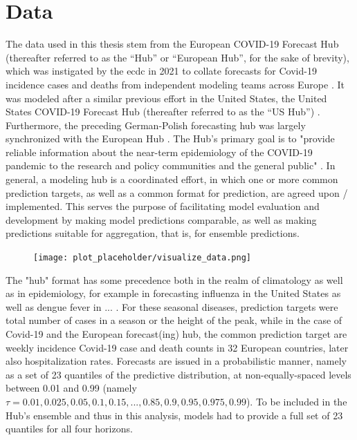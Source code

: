 \section{Data}
The data used in this thesis stem from the European COVID-19 Forecast Hub (thereafter referred to as the ``Hub'' or ``European Hub'', for the sake of brevity), which was instigated by the \ac{ecdc} in 2021 to collate forecasts for Covid-19 incidence cases and deaths from independent modeling teams across Europe \citep{european_covid-19_forecast_hub_european_2021}. It was modeled after a similar previous effort in the United States, the United States COVID-19 Forecast Hub (thereafter referred to as the ``US Hub'') \citep{cramer_united_2021}. Furthermore, the preceding German-Polish forecasting hub was largely synchronized with the European Hub \citep{bracher_german_2020}. The Hub's primary goal is to "provide reliable information about the near-term epidemiology of the COVID-19 pandemic to the research and policy communities and the general public" \citep{sherratt_predictive_2022}. In general, a modeling hub is a coordinated effort, in which one or more common prediction targets, as well as a common format for prediction, are agreed upon / implemented. This serves the purpose of facilitating model evaluation and development by making model predictions comparable, as well as making predictions suitable for aggregation, that is, for ensemble predictions. \\
\begin{figure}
\texttt{[image: plot\_placeholder/visualize\_data.png]}
\end{figure}
The "hub" format has some precedence both in the realm of climatology as well as in epidemiology, for example in forecasting influenza in the United States \cite{reich_collaborative_2019} as well as dengue fever in ... \cite{johansson_open_2019}. For these seasonal diseases, prediction targets were total number of cases in a season or the height of the peak, while in the case of Covid-19 and the European forecast(ing) hub, the common prediction target are weekly incidence Covid-19 case and death counts in 32  European countries, later also hospitalization rates. Forecasts are issued in a probabilistic manner, namely as a set of 23 quantiles of the predictive distribution, at non-equally-spaced levels between 0.01 and 0.99 (namely $\tau = 0.01, 0.025, 0.05, 0.1, 0.15, ..., 0.85, 0.9, 0.95, 0.975, 0.99$).
To be included in the Hub's ensemble and thus in this analysis, models had to provide a full set of 23 quantiles for all four horizons.\\
